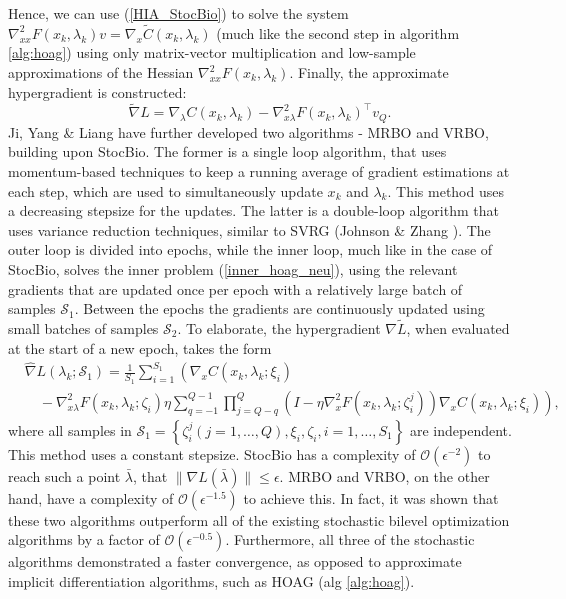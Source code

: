 \documentclass[11pt, twoside]{report}
\begin{document}
Hence, we can use (\ref{HIA_StocBio}) to solve the system $\nabla_{xx}^2 F(x_k,\lambda_k)v = \nabla_x \tilde{C}(x_k,\lambda_k)$ (much like the second step in algorithm \ref{alg:hoag}) using only matrix-vector multiplication and low-sample approximations of the Hessian $\nabla_{xx}^2 F(x_k,\lambda_k)$. Finally, the approximate hypergradient is constructed:
\[\tilde{\nabla} L = \nabla_\lambda C(x_k,\lambda_k) - \nabla_{x \lambda}^2 F(x_k,\lambda_k)^\top v_Q.\]
Ji, Yang \& Liang have further developed two algorithms - MRBO and VRBO, building upon StocBio\cite{yang2021provably}. The former is a single loop algorithm, that uses momentum-based techniques to keep a running average of gradient estimations at each step, which are used to simultaneously update $x_k$ and $\lambda_k$. This method uses a decreasing stepsize for the updates. The latter is a double-loop algorithm that uses variance reduction techniques, similar to SVRG (Johnson \& Zhang \cite{johnson2013accelerating}). The outer loop is divided into epochs, while the inner loop, much like in the case of StocBio, solves the inner problem (\ref{inner_hoag_neu}), using the relevant gradients that are updated once per epoch with a relatively large batch of samples $\mathcal{S}_1$. Between the epochs the gradients are continuously updated using small batches of samples $\mathcal{S}_2$. To elaborate, the hypergradient $\nabla \tilde{L}$, when evaluated at the start of a new epoch, takes the form
\begin{equation} \label{VRBO_hyper}
    \begin{aligned}
&\widehat{\nabla} L\left(\lambda_k ; \mathcal{S}_1\right)=\frac{1}{S_1} \sum_{i=1}^{S_1}\left(\nabla_x C\left(x_k, \lambda_k ; \xi_i\right)\right. \\
&\left.\quad-\nabla_{x \lambda}^2 F\left(x_k, \lambda_k ; \zeta_i\right) \eta \sum_{q=-1}^{Q-1} \prod_{j=Q-q}^Q\left(I-\eta \nabla_x^2 F\left(x_k, \lambda_k ; \zeta_i^j\right)\right) \nabla_x C\left(x_k, \lambda_k ; \xi_i\right)\right),
\end{aligned}
\end{equation}
where all samples in $\mathcal{S}_1 = \left\{\zeta_i^j(j=1, \ldots, Q), \xi_i, \zeta_i, i=1, \ldots, S_1\right\}$ are independent. This method uses a constant stepsize. StocBio has a complexity of $\mathcal{O}(\epsilon^{-2})$ to reach such a point $\bar{\lambda}$, that $\|\nabla L(\bar{\lambda})\| \leq \epsilon.$ MRBO and VRBO, on the other hand, have a complexity of $\mathcal{O}(\epsilon^{-1.5})$ to achieve this. In fact, it was shown that these two algorithms outperform all of the existing stochastic bilevel optimization algorithms by a factor of $\mathcal{O}(\epsilon^{-0.5})$. Furthermore, all three of the stochastic algorithms demonstrated a faster convergence, as opposed to approximate implicit differentiation algorithms, such as HOAG (alg \ref{alg:hoag}).  
\newpage
\end{document}
